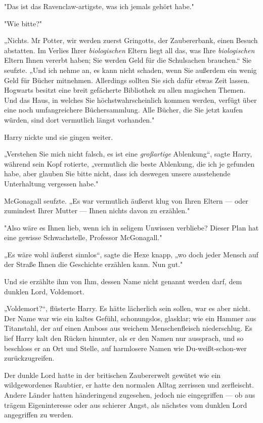 {"Das ist das Ravenclaw-artigste, was ich jemals gehört habe."

"Wie bitte?"

„Nichts. Mr Potter, wir werden zuerst Gringotts, der Zaubererbank, einen Besuch abstatten. Im Verlies Ihrer \emph{biologischen} Eltern liegt all das, was Ihre \emph{biologischen} Eltern Ihnen vererbt haben; Sie werden Geld für die Schulsachen brauchen.“ Sie seufzte. „Und ich nehme an, es kann nicht schaden, wenn Sie außerdem ein wenig Geld für Bücher mitnehmen. Allerdings sollten Sie sich dafür etwas Zeit lassen. Hogwarts besitzt eine breit gefächerte Bibliothek zu allen magischen Themen. Und das Haus, in welches Sie höchstwahrscheinlich kommen werden, verfügt über eine noch umfangreichere Büchersammlung. Alle Bücher, die Sie jetzt kaufen würden, sind dort vermutlich längst vorhanden."

Harry nickte und sie gingen weiter.

„Verstehen Sie mich nicht falsch, es ist eine \emph{großartige} Ablenkung“, sagte Harry, während sein Kopf rotierte, „vermutlich die beste Ablenkung, die ich je gefunden habe, aber glauben Sie bitte nicht, dass ich deswegen unsere ausstehende Unterhaltung vergessen habe."

McGonagall seufzte. „Es war vermutlich äußerst klug von Ihren Eltern --- oder zumindest Ihrer Mutter --- Ihnen nichts davon zu erzählen."

"Also wäre es Ihnen lieb, wenn ich in seligem Unwissen verbliebe? Dieser Plan hat eine gewisse Schwachstelle, Professor McGonagall."

„Es wäre wohl äußerst sinnlos“, sagte die Hexe knapp, „wo doch jeder Mensch auf der Straße Ihnen die Geschichte erzählen kann. Nun gut."

Und sie erzählte ihm von Ihm, dessen Name nicht genannt werden darf, dem dunklen Lord, Voldemort.

„Voldemort?“, flüsterte Harry. Es hätte lächerlich sein sollen, war es aber nicht. Der Name war wie ein kaltes Gefühl, schonungslos, glasklar; wie ein Hammer aus Titanstahl, der auf einen Amboss aus weichem Menschenfleisch niederschlug. Es lief Harry kalt den Rücken hinunter, als er den Namen nur aussprach, und so beschloss er an Ort und Stelle, auf harmlosere Namen wie Du-weißt-schon-wer zurückzugreifen.

Der dunkle Lord hatte in der britischen Zaubererwelt gewütet wie ein wildgewordenes Raubtier, er hatte den normalen Alltag zerrissen und zerfleischt. Andere Länder hatten händeringend zugesehen, jedoch nie eingegriffen --- ob aus trägem Eigeninteresse oder aus schierer Angst, als nächstes vom dunklen Lord angegriffen zu werden.

}
